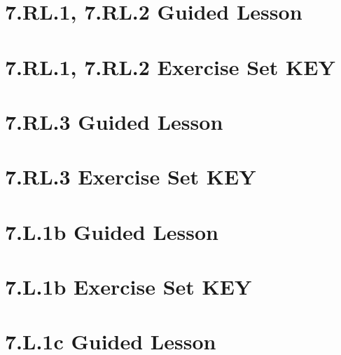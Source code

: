 \documentclass[a4paper,12pt]{article}
\title{}
\date{}
\begin{document}

\newpage

\hypertarget{toc}{}
\tableofcontents
\newpage

\pagestyle{main}

\newpage
\section{7.RL.1, 7.RL.2 Guided Lesson}


\newpage
\section{7.RL.1, 7.RL.2 Exercise Set KEY}

\newpage


\newpage
\section{7.RL.3 Guided Lesson}


\newpage
\section{7.RL.3 Exercise Set KEY}


\newpage
\section{7.L.1b Guided Lesson}


\newpage
\section{7.L.1b Exercise Set KEY}


\newpage
\section{7.L.1c Guided Lesson}

\end{document}
